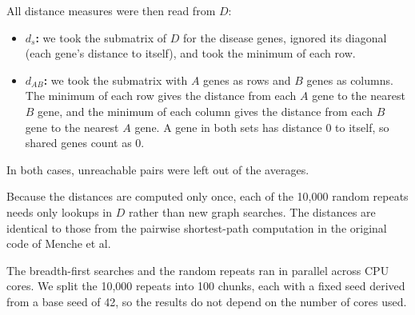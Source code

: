 \documentclass[11pt]{article}
\begin{document}
All distance measures were then read from $D$:

\begin{itemize}
  \item \textbf{$d_s$:} we took the submatrix of $D$ for the disease genes, ignored its diagonal (each gene's distance to itself), and took the minimum of each row.
  \item \textbf{$d_{AB}$:} we took the submatrix with $A$ genes as rows and $B$ genes as columns. The minimum of each row gives the distance from each $A$ gene to the nearest $B$ gene, and the minimum of each column gives the distance from each $B$ gene to the nearest $A$ gene. A gene in both sets has distance 0 to itself, so shared genes count as 0.
\end{itemize}

In both cases, unreachable pairs were left out of the averages.

Because the distances are computed only once, each of the 10,000 random repeats needs only lookups in $D$ rather than new graph searches. The distances are identical to those from the pairwise shortest-path computation in the original code of Menche et al.

The breadth-first searches and the random repeats ran in parallel across CPU cores. We split the 10,000 repeats into 100 chunks, each with a fixed seed derived from a base seed of 42, so the results do not depend on the number of cores used.
\end{document}
